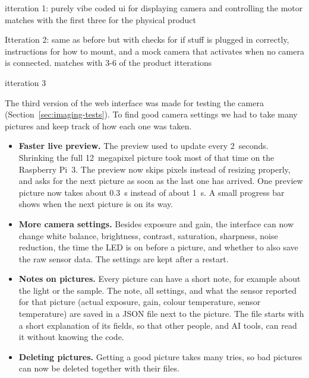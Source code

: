 itteration 1: purely vibe coded ui for displaying camera and controlling the motor matches with the first three for the physical product


Itteration 2: same as before but with checks for if stuff is plugged in correctly, instructions for how to mount, and a mock camera that activates when no camera is connected. matches with 3-6 of the product itterations


itteration 3\label{sec:webui-3}

The third version of the web interface was made for testing the camera (Section~\ref{sec:imaging-tests}).
To find good camera settings we had to take many pictures and keep track of how each one was taken.

\begin{itemize}
  \item \textbf{Faster live preview.} The preview used to update every 2~seconds. Shrinking the full
  12~megapixel picture took most of that time on the Raspberry Pi~3. The preview now skips pixels
  instead of resizing properly, and asks for the next picture as soon as the last one has arrived.
  One preview picture now takes about 0.3~s instead of about 1~s. A small progress bar shows when
  the next picture is on its way.
  \item \textbf{More camera settings.} Besides exposure and gain, the interface can now change white
  balance, brightness, contrast, saturation, sharpness, noise reduction, the time the LED is on before
  a picture, and whether to also save the raw sensor data. The settings are kept after a restart.
  \item \textbf{Notes on pictures.} Every picture can have a short note, for example about the light or
  the sample. The note, all settings, and what the sensor reported for that picture (actual exposure,
  gain, colour temperature, sensor temperature) are saved in a JSON file next to the picture. The file
  starts with a short explanation of its fields, so that other people, and AI tools, can read it
  without knowing the code.
  \item \textbf{Deleting pictures.} Getting a good picture takes many tries, so bad pictures can now be
  deleted together with their files.
\end{itemize}









